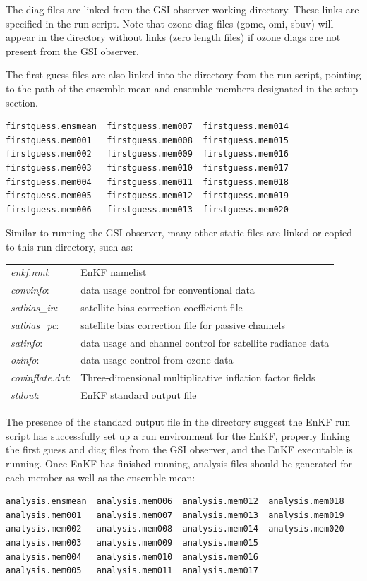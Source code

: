 The diag files are linked from the GSI observer working directory. These links are specified in the run script. Note that ozone diag files (gome, omi, sbuv) will appear in the directory without links (zero length files) if ozone diags are not present from the GSI observer.

The first guess files are also linked into the directory from the run script, pointing to the path of the ensemble mean and ensemble members designated in the setup section.
\begin{footnotesize}
\begin{verbatim}
firstguess.ensmean  firstguess.mem007  firstguess.mem014
firstguess.mem001   firstguess.mem008  firstguess.mem015
firstguess.mem002   firstguess.mem009  firstguess.mem016
firstguess.mem003   firstguess.mem010  firstguess.mem017
firstguess.mem004   firstguess.mem011  firstguess.mem018
firstguess.mem005   firstguess.mem012  firstguess.mem019
firstguess.mem006   firstguess.mem013  firstguess.mem020
\end{verbatim}
\end{footnotesize}


Similar to running the GSI observer, many other static files are linked or copied to this run directory, such as:
\begin{table}[htbp]
\centering
\begin{tabular}{ll}
\textit{enkf.nml}: & EnKF namelist \\
\textit{convinfo}: & data usage control for conventional data \\
\textit{satbias\_in}:& satellite bias correction coefficient file\\
\textit{satbias\_pc}: &satellite bias correction file for passive channels \\
\textit{satinfo}: & data usage and channel control for satellite radiance data\\
\textit{ozinfo}: & data usage control from ozone data\\
\textit{covinflate.dat}: & Three-dimensional multiplicative inflation factor fields\\
\textit{stdout}: & EnKF standard output file\\
\end{tabular}
\end{table}

 The presence of the standard output file in the directory suggest the EnKF run script has successfully set up a run environment for the EnKF, properly linking the first guess and diag files from the GSI observer, and the EnKF executable is running. Once EnKF has finished running, analysis files should be generated for each member as well as the ensemble mean:
 \begin{footnotesize}
 \begin{verbatim}
analysis.ensmean  analysis.mem006  analysis.mem012  analysis.mem018
analysis.mem001   analysis.mem007  analysis.mem013  analysis.mem019
analysis.mem002   analysis.mem008  analysis.mem014  analysis.mem020
analysis.mem003   analysis.mem009  analysis.mem015  
analysis.mem004   analysis.mem010  analysis.mem016
analysis.mem005   analysis.mem011  analysis.mem017
\end{verbatim}
\end{footnotesize}
   
